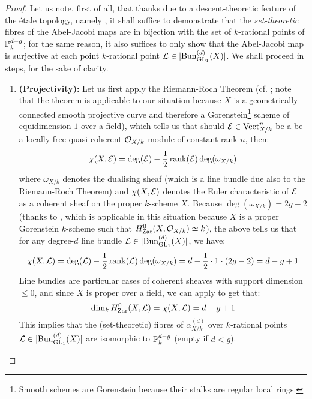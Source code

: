             \begin{proof}
                Let us note, first of all, that thanks due to a descent-theoretic feature of the \'etale topology, namely \cite[\href{https://stacks.math.columbia.edu/tag/024V}{Tag 024V}]{stacks}, it shall suffice to demonstrate that the \textit{set-theoretic} fibres of the Abel-Jacobi maps are in bijection with the set of $k$-rational points of $\P_k^{d - g}$; for the same reason, it also suffices to only show that the Abel-Jacobi map is surjective at each point $k$-rational point $\calL \in |\Bun_{\GL_1}^{(d)}(X)|$. We shall proceed in steps, for the sake of clarity.
                    \begin{enumerate}
                        \item \textbf{(Projectivity):} Let us first apply the Riemann-Roch Theorem (cf. \cite[\href{https://stacks.math.columbia.edu/tag/0BS6}{Tag 0BS6}]{stacks}; note that the theorem is applicable to our situation because $X$ is a geometrically connected smooth projective curve and therefore a Gorenstein\footnote{Smooth schemes are Gorenstein because their stalks are regular local rings.} scheme of equidimension $1$ over a field), which tells us that should $\E \in \Vect_{X/k}^n$ be a be a locally free quasi-coherent $\calO_{X/k}$-module of constant rank $n$, then:
                            $$\chi(X, \E) = \deg(\E) - \frac12\rank(\E) \deg(\omega_{X/k})$$
                        where $\omega_{X/k}$ denotes the dualising sheaf (which is a line bundle due also to the Riemann-Roch Theorem) and $\chi(X, \E)$ denotes the Euler characteristic of $\E$ as a coherent sheaf on the proper $k$-scheme $X$. Because $\deg(\omega_{X/k}) = 2g - 2$ (thanks to \cite[\href{https://stacks.math.columbia.edu/tag/0C19}{Tag 0C19}]{stacks}, which is applicable in this situation because $X$ is a proper Gorenstein $k$-scheme such that $H^0_{\Zar}(X, \calO_{X/k}) \cong k$), the above tells us that for any degree-$d$ line bundle $\calL \in |\Bun_{\GL_1}^{(d)}(X)|$, we have:
                            $$\chi(X, \calL) = \deg(\calL) - \frac12 \rank(\calL) \deg(\omega_{X/k}) = d - \frac12 \cdot 1 \cdot (2g - 2) = d - g + 1$$
                        Line bundles are particular cases of coherent sheaves with support dimension $\leq 0$, and since $X$ is proper over a field, we can apply \cite[\href{https://stacks.math.columbia.edu/tag/0AYT}{Tag 0AYT}]{stacks} to get that:
                            $$\dim_k H^0_{\Zar}(X, \calL) = \chi(X, \calL) = d - g + 1$$
                        This implies that the (set-theoretic) fibres of $\alpha_{X/k}^{(d)}$ over $k$-rational points $\calL \in |\Bun_{\GL_1}^{(d)}(X)|$ are isomorphic to $\P^{d - g}_k$ (empty if $d < g$).

\end{enumerate}
\end{proof}
